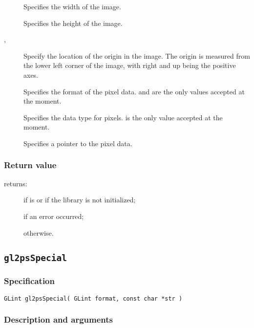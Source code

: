 \begin{description}
\item[] Specifies the width of the image.
\item[] Specifies the height of the image.
\item[, ] Specify the location of the origin in the
  image.  The origin is measured from the lower left corner of the image,
  with right and up being the positive axes.
\item[] Specifies the format of the pixel data.  and
   are the only values accepted at the moment.
\item[] Specifies the data type for pixels.  is the
  only value accepted at the moment.
\item[] Specifies a pointer to the pixel data.
\end{description}

\subsubsection{Return value}

\noindent{} returns:
\begin{description}
\item[] if  is  or if the
  library is not initialized;
\item[] if an error occurred;
\item[] otherwise.
\end{description}


\subsection{\texttt{gl2psSpecial}}
\label{sec:gl2psSpecial}

\subsubsection{Specification}

\begin{verbatim}
GLint gl2psSpecial( GLint format, const char *str )
\end{verbatim}

\subsubsection{Description and arguments}

